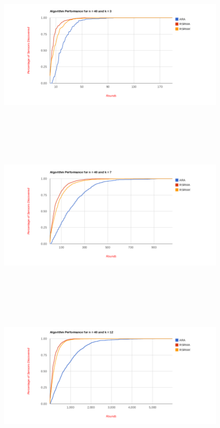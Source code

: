 \begin{figure}[ht]
\caption{}
\includegraphics[height = 8cm]{pics/graph40k3.png}\\[0.5cm]    
\label{fig:n40k3}
\end{figure}

\begin{figure}[ht]
\caption{}
\includegraphics[height = 8cm]{pics/graph40k7.png}\\[0.5cm]   
\label{fig:n40k7} 
\end{figure}

\begin{figure}[ht]
\caption{}
\includegraphics[height = 8cm]{pics/graph40k12.png}\\[0.5cm] 
\label{fig:n40k12}   
\end{figure}

